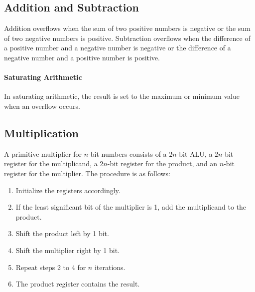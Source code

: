 \documentclass[a4paper,12pt]{article}
\begin{document}
\subsection{Addition and Subtraction}

Addition overflows when the sum of two positive numbers is negative or the sum of two negative numbers is positive. Subtraction overflows when the difference of a positive number and a negative number is negative or the difference of a negative number and a positive number is positive.

\paragraph{Saturating Arithmetic} In saturating arithmetic, the result is set to the maximum or minimum value when an overflow occurs.

\subsection{Multiplication}

A primitive multiplier for $n$-bit numbers consists of a $2n$-bit ALU, a $2n$-bit register for the multiplicand, a $2n$-bit register for the product, and an $n$-bit register for the multiplier. The procedure is as follows:
\begin{enumerate}
	\item Initialize the registers accordingly.
	\item If the least significant bit of the multiplier is 1, add the multiplicand to the product.
	\item Shift the product left by 1 bit.
	\item Shift the multiplier right by 1 bit.
	\item Repeat steps 2 to 4 for $n$ iterations.
	\item The product register contains the result.
\end{enumerate}
\end{document}
